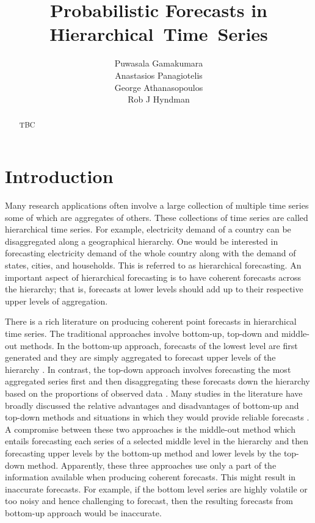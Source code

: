 \documentclass[a4paper, 11pt]{article}
\title{Probabilistic Forecasts in Hierarchical~Time~Series}
\author{Puwasala Gamakumara\\ Anastasios Panagiotelis\\ George Athanasopoulos\\ Rob J Hyndman}
\begin{document}
\maketitle

\begin{abstract}
  TBC
\end{abstract}


\section{Introduction}

Many research applications often involve a large collection of multiple time series some of which are aggregates of others.
These collections of time series are called hierarchical time series. For example, electricity demand of a country can be disaggregated along a geographical hierarchy. One would be interested in forecasting electricity demand of the whole country along with the demand of states, cities, and households. This is referred to as hierarchical forecasting. An important aspect of hierarchical forecasting is to have coherent forecasts across the hierarchy; that is, forecasts at lower levels should add up to their respective upper levels of aggregation.

There is a rich literature on producing coherent point forecasts in hierarchical time series. The traditional approaches involve bottom-up, top-down and middle-out methods. In the bottom-up approach, forecasts of the lowest level are first generated and they are simply aggregated to forecast upper levels of the hierarchy \citep{Dunn1976}.
In contrast, the top-down approach involves forecasting the most aggregated series first and then disaggregating these forecasts down the hierarchy based on the proportions of observed data \citep{Gross1990}.
Many studies in the literature have broadly discussed the relative advantages and disadvantages of bottom-up and top-down methods and situations in which they would provide reliable forecasts \citep{Schwarzkopf1988,Kahn1998, Lapide1998,Fliedner2001}.
A compromise between these two approaches is the middle-out method which entails forecasting each series of a selected middle level in the hierarchy and then forecasting upper levels by the bottom-up method and lower levels by the top-down method. Apparently, these three approaches use only a part of the information available when producing coherent forecasts. This might result in inaccurate forecasts. For example, if the bottom level series are highly volatile or too noisy and hence challenging to forecast, then the resulting forecasts from bottom-up approach would be inaccurate.
\end{document}
